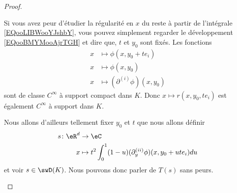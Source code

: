 \begin{proof}
\begin{subproof}
		Si vous avez peur d'étudier la régularité en \( x\) du reste à partir de l'intégrale \eqref{EQooLIBWooYJshbY}, vous pouvez simplement regarder le développement \eqref{EQooBMYMooAjrTGH} et dire que, \( t\) et \( y_0\) sont fixés. Les fonctions
		\begin{subequations}
			\begin{align}
				x & \mapsto \phi(x, y_0+te_i)           \\
				x & \mapsto \phi(x, y_0)                \\
				x & \mapsto (\partial^{(i)}\phi)(x,y_0)
			\end{align}
		\end{subequations}
		sont de classe \(  C^{\infty}\) à support compact dans \( K\). Donc \( x\mapsto r(x,y_0,te_i)\) est également \(  C^{\infty}\) à support dans \( K\).

		Nous allons d'ailleurs tellement fixer \( y_0\) et \( t\) que nous allons définir
		\begin{equation}
			\begin{aligned}
				s\colon \eR^d & \to \eC                                                         \\
				x             & \mapsto  t^2\int_0^1(1-u)(\partial_y^{(ii)}\phi)(x,y_0+ute_i)du
			\end{aligned}
		\end{equation}
		et voir \( s\in\swD(K)\). Nous pouvons donc parler de \( T(s)\) sans peurs.


\end{subproof}
\end{proof}

